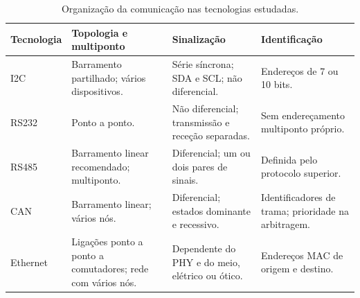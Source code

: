 \begin{table}[htbp]
    \centering
    \small
    \setlength{\tabcolsep}{4pt}
    \renewcommand{\arraystretch}{1.12}
    \caption{Organização da comunicação nas tecnologias estudadas.}
    \label{tab:comparacao-organizacao}
    \begin{tabularx}{\textwidth}{@{}>{\raggedright\arraybackslash}p{}*{3}{>{\raggedright\arraybackslash}X}@{}}
        \toprule
        Tecnologia & Topologia e multiponto & Sinalização & Identificação \\
        \midrule
        I2C~\cite{nxp_um10204_2021}
        & Barramento partilhado; vários dispositivos.
        & Série síncrona; SDA e SCL; não diferencial.
        & Endereços de 7 ou 10 bits. \\
        \addlinespace
        RS232~\cite{dodson_rs232_2023}
        & Ponto a ponto.
        & Não diferencial; transmissão e receção separadas.
        & Sem endereçamento multiponto próprio. \\
        \addlinespace
        RS485~\cite{ti_rs485_an1057_2013}
        & Barramento linear recomendado; multiponto.
        & Diferencial; um ou dois pares de sinais.
        & Definida pelo protocolo superior. \\
        \addlinespace
        CAN~\cite{cia_can_cc,cia_can_hs}
        & Barramento linear; vários nós.
        & Diferencial; estados dominante e recessivo.
        & Identificadores de trama; prioridade na arbitragem. \\
        \addlinespace
        Ethernet~\cite{simmons_ethernet_2008,ieee_8023_2018}
        & Ligações ponto a ponto a comutadores; rede com vários nós.
        & Dependente do PHY e do meio, elétrico ou ótico.
        & Endereços MAC de origem e destino. \\
        \bottomrule
    \end{tabularx}
\end{table}

